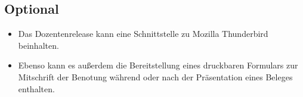 \documentclass{article}
\begin{document}
\subsection{Optional}
\begin{itemize}
\item Das Dozentenrelease kann eine Schnittstelle zu Mozilla Thunderbird beinhalten.

\item Ebenso kann es außerdem die Bereitstellung eines druckbaren Formulars zur Mitschrift der Benotung während oder nach der Präsentation eines Beleges enthalten.\\
\end{itemize}
\end{document}

